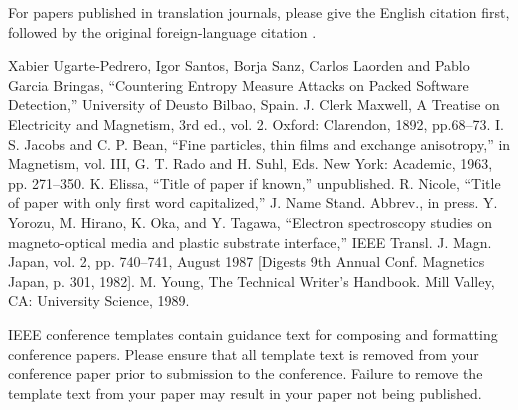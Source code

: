 \documentclass[conference]{IEEEtran}
\begin{document}
For papers published in translation journals, please give the English 
citation first, followed by the original foreign-language citation \cite{b6}.

\begin{thebibliography}{00}
 Xabier Ugarte-Pedrero, Igor Santos, Borja Sanz, Carlos Laorden and Pablo Garcia Bringas, ``Countering Entropy Measure Attacks on Packed
Software Detection,'' University of Deusto
Bilbao, Spain.
 J. Clerk Maxwell, A Treatise on Electricity and Magnetism, 3rd ed., vol. 2. Oxford: Clarendon, 1892, pp.68--73.
 I. S. Jacobs and C. P. Bean, ``Fine particles, thin films and exchange anisotropy,'' in Magnetism, vol. III, G. T. Rado and H. Suhl, Eds. New York: Academic, 1963, pp. 271--350.
 K. Elissa, ``Title of paper if known,'' unpublished.
 R. Nicole, ``Title of paper with only first word capitalized,'' J. Name Stand. Abbrev., in press.
 Y. Yorozu, M. Hirano, K. Oka, and Y. Tagawa, ``Electron spectroscopy studies on magneto-optical media and plastic substrate interface,'' IEEE Transl. J. Magn. Japan, vol. 2, pp. 740--741, August 1987 [Digests 9th Annual Conf. Magnetics Japan, p. 301, 1982].
 M. Young, The Technical Writer's Handbook. Mill Valley, CA: University Science, 1989.
\end{thebibliography}
\vspace{12pt}
\color{red}
IEEE conference templates contain guidance text for composing and formatting conference papers. Please ensure that all template text is removed from your conference paper prior to submission to the conference. Failure to remove the template text from your paper may result in your paper not being published.
\end{document}
